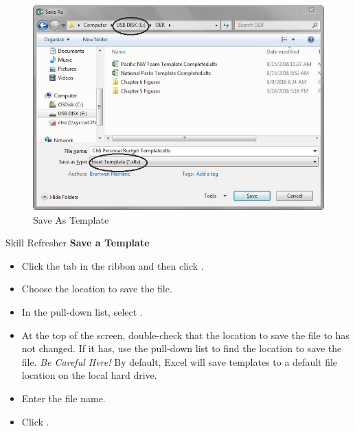 \begin{figure}[H]
	\centering
	\includegraphics[width=\maxwidth{.95\linewidth}]{gfx/ch06_fig11}
	\caption{Save As Template}
	\label{06:fig11}
\end{figure}

\begin{center}
	\begin{sklbox}{Skill Refresher}
		\textbf{Save a Template}
		\\
		\begin{itemize}
			\setlength{\itemsep}{0pt}
			\setlength{\parskip}{0pt}
			\setlength{\parsep}{0pt}

			\item Click the  tab in the ribbon and then click .
			\item Choose the location to save the file.
			\item In the  pull-down list, select .
			\item At the top of the screen, double-check that the location to save the file to has not changed. If it has, use the pull-down list to find the location to save the file. \textit{Be Careful Here!} By default, Excel will save templates to a default file location on the local hard drive.
			\item Enter the file name.
			\item Click .
			
		\end{itemize}
	\end{sklbox}
\end{center}

